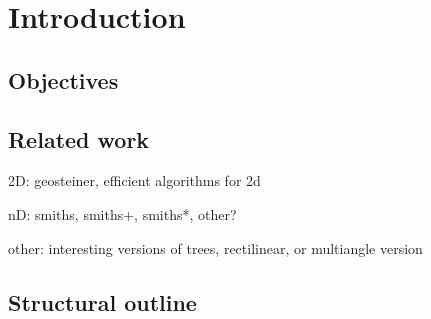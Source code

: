 {
\abnormalparskip{0pt}
\chapter{Introduction}
\label{cha:introduction}
}


\section{Objectives}
\label{sec:objectives}


\section{Related work}
\label{sec:related-work}

2D: geosteiner, efficient algorithms for 2d

nD: smiths, smiths+, smiths*, other?

other: interesting versions of trees, rectilinear, or multiangle version


\section{Structural outline}
\label{sec:structural-outline}



